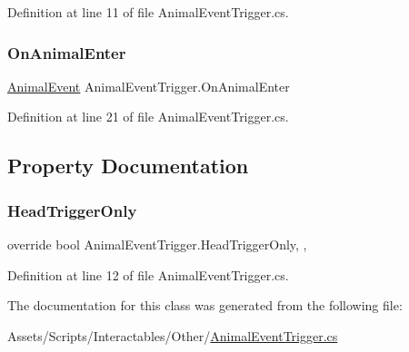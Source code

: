 Definition at line 11 of file Animal\+Event\+Trigger.\+cs.

\mbox{\label{class_animal_event_trigger_a100c0ac522061547977fccac8a2d0c0a}} 
\subsubsection{\texorpdfstring{On\+Animal\+Enter}{OnAnimalEnter}}
{\footnotesize\ttfamily \mbox{\hyperlink{class_animal_event_trigger_1_1_animal_event}{Animal\+Event}} Animal\+Event\+Trigger.\+On\+Animal\+Enter}



Definition at line 21 of file Animal\+Event\+Trigger.\+cs.



\subsection{Property Documentation}
\mbox{\label{class_animal_event_trigger_a5eac9fac285d9f0f549e6b2764ed1886}} 
\subsubsection{\texorpdfstring{Head\+Trigger\+Only}{HeadTriggerOnly}}
{\footnotesize\ttfamily override bool Animal\+Event\+Trigger.\+Head\+Trigger\+Only\hspace{0.3cm}{\ttfamily [get]}, {\ttfamily [set]}, {\ttfamily [protected]}}



Definition at line 12 of file Animal\+Event\+Trigger.\+cs.



The documentation for this class was generated from the following file\+:\begin{DoxyCompactItemize}
\item 
Assets/\+Scripts/\+Interactables/\+Other/\mbox{\hyperlink{_animal_event_trigger_8cs}{Animal\+Event\+Trigger.\+cs}}\end{DoxyCompactItemize}
